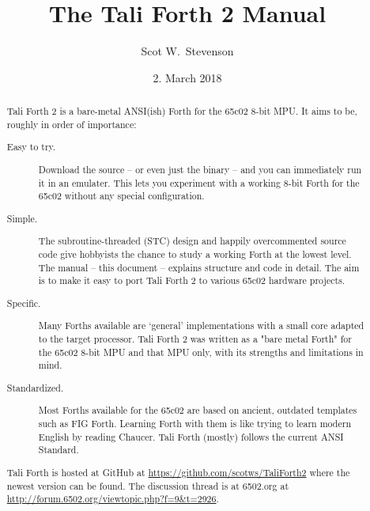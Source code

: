 \documentclass[a4paper,notitlepage]{report}
\title{The Tali Forth 2 Manual}
\author{Scot W.~Stevenson}
\date{2. March 2018}
\begin{document}
\maketitle

\begin{abstract}
        Tali Forth 2 is a bare-metal ANSI(ish) Forth for the 65c02 8-bit MPU. 
        It aims to be, roughly in order of importance: 

        \begin{description}

        \item [Easy to try.] Download the source -- or even just the binary --
                and you can immediately run it in an emulater. This lets
                you experiment with a working 8-bit Forth for the 65c02
                without any special configuration.

        \item [Simple.] The subroutine-threaded (STC) design and happily
                overcommented source code give hobbyists the chance to study a
                working Forth at the lowest level. The manual -- this
                document -- explains structure and code in detail. The aim
                is to make it easy to port Tali Forth 2
                to various 65c02 hardware projects.

        \item [Specific.] Many Forths available are `general' implementations with
                a small core adapted to the target processor. Tali Forth 2 was
                written as a "bare metal Forth" for the 65c02 8-bit MPU
                and that MPU only, with its strengths and limitations in
                mind.

        \item [Standardized.] Most Forths available for the 65c02 are based on ancient,
                outdated templates such as FIG Forth. Learning Forth with them is like
                trying to learn modern English by reading Chaucer. Tali
                Forth (mostly) follows the current ANSI Standard.
\end{description}

        Tali Forth is hosted at GitHub at
        \href{https://github.com/scotws/TaliForth2}{https://github.com/scotws/TaliForth2}
        where the newest version can be found. The discussion thread is at
        6502.org at
        \href{http://forum.6502.org/viewtopic.php?f=9\&t=2926}{http://forum.6502.org/viewtopic.php?f=9\&t=2926}.
        
\end{abstract}
\end{document}
